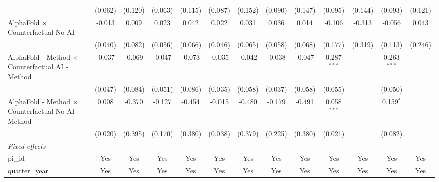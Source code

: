 \begin{tabular}{lcccccccccccc}
                                                              & (0.062)        & (0.120)       & (0.063)        & (0.115)       & (0.087)        & (0.152)        & (0.090)        & (0.147)        & (0.095)        & (0.144)       & (0.093)       & (0.121)\\   
   AlphaFold $\times$ Counterfactual No AI                    & -0.013         & 0.009         & 0.023          & 0.042         & 0.022          & 0.031          & 0.036          & 0.014          & -0.106         & -0.313        & -0.056        & 0.043\\   
                                                              & (0.040)        & (0.082)       & (0.056)        & (0.066)       & (0.046)        & (0.065)        & (0.058)        & (0.068)        & (0.177)        & (0.319)       & (0.113)       & (0.246)\\   
   AlphaFold - Method $\times$ Counterfactual AI - Method     & -0.037         & -0.069        & -0.047         & -0.073        & -0.035         & -0.042         & -0.038         & -0.047         & 0.287$^{***}$  &               & 0.263$^{***}$ &   \\   
                                                              & (0.047)        & (0.084)       & (0.051)        & (0.086)       & (0.035)        & (0.058)        & (0.037)        & (0.058)        & (0.055)        &               & (0.050)       &   \\   
   AlphaFold - Method $\times$ Counterfactual No AI - Method  & 0.008          & -0.370        & -0.127         & -0.454        & -0.015         & -0.480         & -0.179         & -0.491         & 0.058$^{***}$  &               & 0.159$^{*}$   &   \\   
                                                              & (0.020)        & (0.395)       & (0.170)        & (0.380)       & (0.038)        & (0.379)        & (0.225)        & (0.380)        & (0.021)        &               & (0.082)       &   \\   
   \midrule
   \emph{Fixed-effects}\\
   pi\_id                                                     & Yes            & Yes           & Yes            & Yes           & Yes            & Yes            & Yes            & Yes            & Yes            & Yes           & Yes           & Yes\\  
   quarter\_year                                              & Yes            & Yes           & Yes            & Yes           & Yes            & Yes            & Yes            & Yes            & Yes            & Yes           & Yes           & Yes\\  

\end{tabular}
